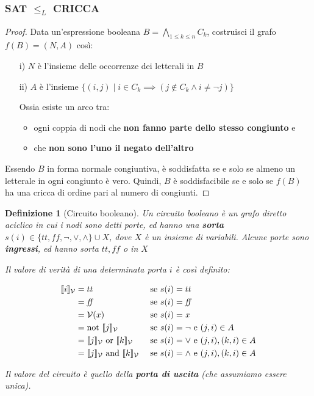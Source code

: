 \documentclass[a4paper,10pt,oneside]{article}
\theoremstyle{break}
\newtheorem{deff}{Definizione}[section]
\begin{document}
\begin{mdframed}
\subsubsection{SAT $\leq_L$ CRICCA}

\begin{proof}
 Data un'espressione booleana $B = \bigwedge_{1\leq k\leq n}C_k$, costruisci il grafo $f(B) = (N, A)$ così:
 
 \begin{itemize}
  \item[i)] $N$ è l'insieme delle occorrenze dei letterali in $B$
  \item[ii)] $A$ è l'insieme $\{ (i, j) \mid i \in C_k \implies (j \notin C_k \wedge i \neq \neg j) \}$
  
  Ossia esiste un arco tra:
  
  \begin{itemize}
   \item ogni coppia di nodi che \textbf{non fanno parte dello stesso congiunto} e
   \item che \textbf{non sono l'uno il negato dell'altro}
  
  \end{itemize}

 \end{itemize}
Essendo $B$ in forma normale congiuntiva, è soddisfatta se e solo se almeno un letterale in ogni congiunto è vero. Quindi, $B$ è soddisfacibile se e solo se $f(B)$ ha una cricca di ordine pari al numero di congiunti.
\end{proof}

\end{mdframed}


\begin{deff}[Circuito booleano]
 Un circuito booleano è un grafo diretto aciclico in cui i nodi sono detti porte, ed hanno una \textbf{sorta} $s(i) \in \{tt, \textit{ff}, \neg, \vee, \wedge\}\cup X$, dove $X$ è un insieme di variabili. Alcune porte sono \textbf{ingressi}, ed hanno sorta $tt, \textit{ff}$ o in $X$\smallskip
 

 Il valore di verità di una determinata porta $i$ è così definito:
 
 \[ \begin{aligned}
[\![ i ]\!]_\mathcal{V} &= tt && \text{ se } s(i)= tt\\
&= \emph{ff} && \text{ se } s(i)= \emph{ff}\\
&= \mathcal V(x) && \text{ se } s(i)= \emph{x}\\
&= \text{not } [\![ j ]\!]_\mathcal{V}  && \text{ se } s(i)= \neg \text{ e } (j, i) \in A\\
&= [\![ j ]\!]_\mathcal{V} \text{ or } [\![ k ]\!]_\mathcal{V}  && \text{ se } s(i)= \vee \text{ e } (j, i), (k, i) \in A\\
&= [\![ j ]\!]_\mathcal{V} \text{ and } [\![ k ]\!]_\mathcal{V}  && \text{ se } s(i)= \wedge \text{ e } (j, i), (k, i) \in A\\
\end{aligned}\]
 
 Il valore del circuito è quello della \textbf{porta di uscita} (che assumiamo essere unica).
\end{deff}
\end{document}
